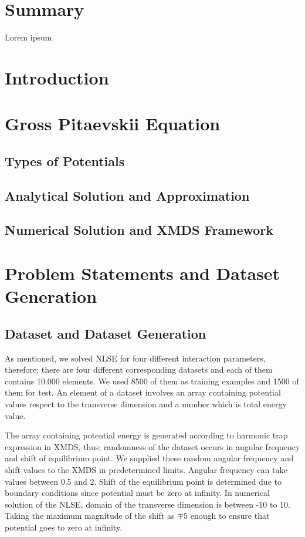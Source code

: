 \documentclass[a4paper,times,12pt]{article}
\title{}%
\date{}
\begin{document}
\setcounter{page}{1}

\section*{Summary}
Lorem ipsum
\section{Introduction}
\section{Gross Pitaevskii Equation}
\subsection{Types of Potentials}
\subsection{Analytical Solution and Approximation}
\subsection{Numerical Solution and XMDS Framework}
\section{Problem Statements and Dataset Generation}

\subsection{Dataset and Dataset Generation}

As mentioned, we solved NLSE for four different interaction parameters, therefore; there are four different corresponding datasets and each of them contains 10.000 elements. We used 8500 of them as training examples and 1500 of them for test. An element of a dataset involves an array containing potential values respect to the transverse dimension and a number which is total energy value.

The array containing potential energy is generated according to harmonic trap expression in XMDS, thus; randomness of the dataset occurs in angular frequency and shift of equilibrium point. We supplied these random angular frequency and shift values to the XMDS in predetermined limits. Angular frequency can take values between 0.5 and 2. Shift of the equilibrium point is determined due to boundary conditions since potential must be zero at infinity. In numerical solution of the NLSE, domain of the transverse dimension is between -10 to 10. Taking the maximum magnitude of the shift as $\mp 5$ enough to ensure that potential goes to zero at infinity.
\end{document}
